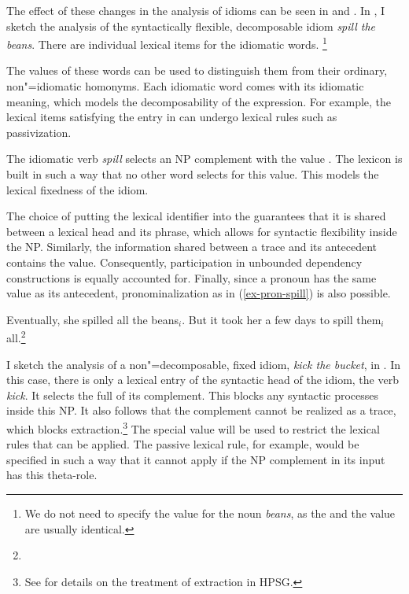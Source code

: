 \documentclass[output=paper,biblatex,babelshorthands,newtxmath,draftmode,colorlinks,citecolor=brown]{langscibook}
\begin{document}
The effect of these changes in the analysis of idioms can be seen in  and . In , I sketch the analysis of the syntactically flexible, decomposable idiom \emph{spill the beans}.  There are individual lexical items for the idiomatic words.%
\footnote{We do not need to specify the  value for the noun \emph{beans}, as the  and the  value are usually identical.}

\eal %
\label{ke-spill}
\ex 
\label{le-idiomatic-spill}
\ex 
{}
\zl 

\noindent
The  values of these words can be used to distinguish them from their ordinary,
non"=idiomatic homonyms.  Each idiomatic word comes with its idiomatic meaning, which models the
decomposability of the expression.  For example, the lexical items satisfying the entry in
 can undergo lexical rules such as passivization.

\largerpage[1]
The idiomatic verb \emph{spill} selects an NP complement with the  value
.  The lexicon is built in such a way that no other word selects for this
 value.  This models the lexical fixedness of the idiom.

The choice of putting the lexical identifier into the  guarantees that it is shared
between a lexical head and its phrase, which allows for syntactic flexibility inside the NP.
Similarly, the information shared between a trace and its antecedent contains the 
value. Consequently, participation in unbounded dependency constructions is equally accounted for.
Finally, since a pronoun has the same  value as its antecedent, pronominalization as in
(\ref{ex-pron-spill}) is also possible.

\ea
 \label{ex-pron-spill}
Eventually, she spilled all the beans$_i$. But it took her a few days to spill them$_i$
all.\footnote{
}
\z

I sketch the analysis of a non"=decomposable, fixed idiom, \emph{kick the bucket}, in
.  In this case, there is only a lexical entry of the syntactic head of the idiom,
the verb \emph{kick}.  It selects the full  of its complement. This blocks any syntactic
processes inside this NP. It also follows that the complement cannot be realized as a trace, which
blocks extraction.\footnote{See  for
  details on the treatment of extraction in HPSG.}  
%
The special  value  will be used to restrict the lexical rules that can
be applied.  The passive lexical rule, for example, would be specified in such a way that it cannot
apply if the NP complement in its input has this theta-role.
\end{document}
